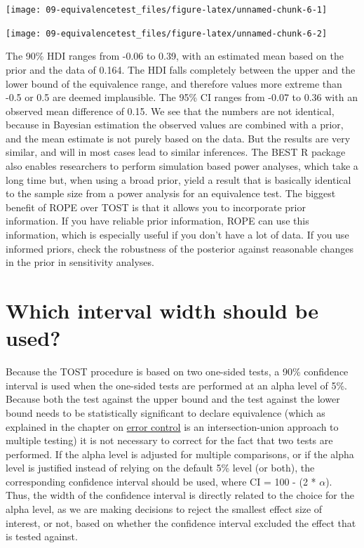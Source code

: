 \documentclass[
  oneside]{book}
\begin{document}
\begin{center}\texttt{[image: 09-equivalencetest\_files/figure-latex/unnamed-chunk-6-1]} \end{center}

\begin{center}\texttt{[image: 09-equivalencetest\_files/figure-latex/unnamed-chunk-6-2]} \end{center}

The 90\% HDI ranges from -0.06 to 0.39, with an estimated mean based on the prior and the data of 0.164. The HDI falls completely between the upper and the lower bound of the equivalence range, and therefore values more extreme than -0.5 or 0.5 are deemed implausible. The 95\% CI ranges from -0.07 to 0.36 with an observed mean difference of 0.15. We see that the numbers are not identical, because in Bayesian estimation the observed values are combined with a prior, and the mean estimate is not purely based on the data. But the results are very similar, and will in most cases lead to similar inferences. The BEST R package also enables researchers to perform simulation based power analyses, which take a long time but, when using a broad prior, yield a result that is basically identical to the sample size from a power analysis for an equivalence test. The biggest benefit of ROPE over TOST is that it allows you to incorporate prior information. If you have reliable prior information, ROPE can use this information, which is especially useful if you don't have a lot of data. If you use informed priors, check the robustness of the posterior against reasonable changes in the prior in sensitivity analyses.

\hypertarget{whichinterval}{%
\section{Which interval width should be used?}\label{whichinterval}}

Because the TOST procedure is based on two one-sided tests, a 90\% confidence interval is used when the one-sided tests are performed at an alpha level of 5\%. Because both the test against the upper bound and the test against the lower bound needs to be statistically significant to declare equivalence (which as explained in the chapter on \protect\hyperlink{multiplecomparisons}{error control} is an intersection-union approach to multiple testing) it is not necessary to correct for the fact that two tests are performed. If the alpha level is adjusted for multiple comparisons, or if the alpha level is justified instead of relying on the default 5\% level (or both), the corresponding confidence interval should be used, where CI = 100 - (2 * \(\alpha\)). Thus, the width of the confidence interval is directly related to the choice for the alpha level, as we are making decisions to reject the smallest effect size of interest, or not, based on whether the confidence interval excluded the effect that is tested against.
\end{document}
